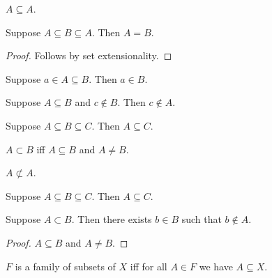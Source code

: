 \begin{proposition}%
\label{subseteq_refl}
    $A\subseteq A$.
\end{proposition}

\begin{proposition}%
\label{subseteq_antisymmetric}
    Suppose $A\subseteq B\subseteq A$.
    Then $A = B$.
\end{proposition}
\begin{proof}
    Follows by set extensionality.
\end{proof}

\begin{proposition}%
\label{elem_subseteq}
    Suppose $a\in A\subseteq B$.
    Then $a\in B$.
\end{proposition}

\begin{proposition}%
\label{not_in_subseteq}
    Suppose $A\subseteq B$ and $c\notin B$.
    Then $c\notin A$.
\end{proposition}

\begin{proposition}%
\label{subseteq_transitive}
    Suppose $A\subseteq B\subseteq C$.
    Then $A\subseteq C$.
\end{proposition}

\begin{definition}\label{subset}
    $A\subset B$ iff
    $A\subseteq B$ and $A\neq B$.
\end{definition}

\begin{proposition}\label{subset_irrefl}
    $A\not\subset A$.
\end{proposition}

\begin{proposition}\label{subset_transitive}
    Suppose $A\subseteq B\subseteq C$.
    Then $A\subseteq C$.
\end{proposition}

\begin{proposition}\label{subset_witness}
    Suppose $A\subset B$.
    Then there exists $b\in B$ such that $b\notin A$.
\end{proposition}
\begin{proof}
    $A\subseteq B$ and $A\neq B$.
\end{proof}

\begin{abbreviation}\label{family_of_subsets}
    $F$ is a family of subsets of $X$ iff
    for all $A\in F$ we have $A\subseteq X$.
\end{abbreviation}


